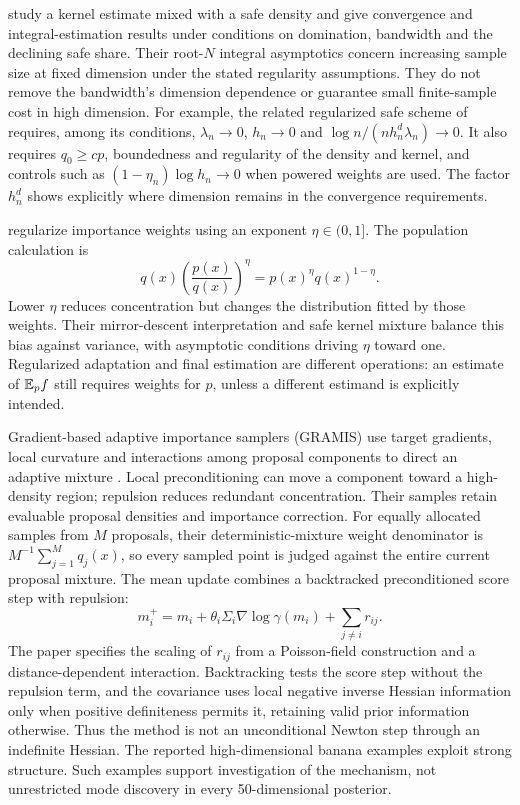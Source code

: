 \citet[Theorems 7--9]{delyon2021safe} study a kernel estimate mixed with a safe
density and give convergence and integral-estimation results under conditions
on domination, bandwidth and the declining safe share. Their root-$N$ integral
asymptotics concern increasing sample size at fixed dimension under the stated
regularity assumptions. They do not remove the bandwidth's dimension dependence
or guarantee small finite-sample cost in high dimension.
For example, the related regularized safe scheme of \citet{korba2022mirror}
requires, among its conditions, $\lambda_n\to0$, $h_n\to0$ and
$\log n/(n h_n^d\lambda_n)\to0$. It also requires $q_0\ge c p$, boundedness
and regularity of the density and kernel, and controls such as
$(1-\eta_n)\log h_n\to0$ when powered weights are used. The factor $h_n^d$
shows explicitly where dimension remains in the convergence requirements.

\citet[Sections 2--3]{korba2022mirror} regularize importance weights using an
exponent $\eta\in(0,1]$. The population calculation is
\begin{equation}
 q(x)\left(\frac{p(x)}{q(x)}\right)^\eta
 =p(x)^\eta q(x)^{1-\eta}.
 \label{eq:bf-is-power-weights}
\end{equation}
Lower $\eta$ reduces concentration but changes the distribution fitted by those
weights. Their mirror-descent interpretation and safe kernel mixture balance
this bias against variance, with asymptotic conditions driving $\eta$ toward
one. Regularized adaptation and final estimation are different operations: an
estimate of $\mathbb{E}_pf$ still requires weights for $p$, unless a different estimand
is explicitly intended.

Gradient-based adaptive importance samplers (GRAMIS) use target gradients,
local curvature and interactions among proposal components to direct an
adaptive mixture \citep[Section 3 and Table 2]{elvira2023gramis}. Local
preconditioning can move a component toward a high-density region; repulsion
reduces redundant concentration. Their samples retain evaluable proposal
densities and importance correction. For equally allocated samples from $M$ proposals, their deterministic-mixture
weight denominator is $M^{-1}\sum_{j=1}^M q_j(x)$, so every sampled point is
judged against the entire current proposal mixture. The mean update combines
a backtracked preconditioned score step with repulsion:
\begin{equation}
 m_i^+=m_i+\theta_i\Sigma_i\nabla\log\gamma(m_i)
                   +\sum_{j\ne i}r_{ij}.
 \label{eq:bf-is-gramis-step}
\end{equation}
The paper specifies the scaling of $r_{ij}$ from a Poisson-field construction
and a distance-dependent interaction. Backtracking tests the score step
without the repulsion term, and the covariance uses local negative inverse
Hessian information only when positive definiteness permits it, retaining
valid prior information otherwise. Thus the method is not an unconditional
Newton step through an indefinite Hessian. The reported high-dimensional banana
examples exploit strong structure. Such examples support investigation of the
mechanism, not unrestricted mode discovery in every 50-dimensional posterior.

